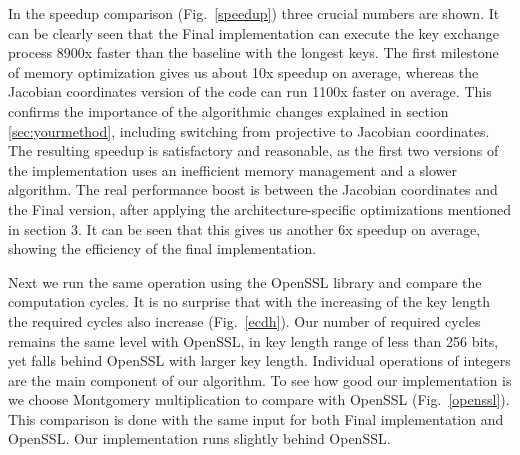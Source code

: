 In the speedup comparison (Fig.~\ref{speedup}) three crucial numbers are shown. It can be clearly seen that the Final implementation can execute the key exchange process 8900x faster than the baseline with the longest keys. The first milestone of memory optimization gives us about 10x speedup on average, whereas the Jacobian coordinates version of the code can run 1100x faster on average. This confirms the importance of the algorithmic changes explained in section \ref{sec:yourmethod}, including switching from projective to Jacobian coordinates. The resulting speedup is satisfactory and reasonable, as the first two versions of the implementation uses an inefficient memory management and a slower algorithm. The real performance boost is between the Jacobian coordinates and the Final version, after applying the architecture-specific optimizations mentioned in section 3. It can be seen that this gives us another 6x speedup on average, showing the efficiency of the final implementation.

Next we run the same operation using the OpenSSL library and compare the computation cycles. It is no surprise that with the increasing of the key length the required cycles also increase (Fig.~\ref{ecdh}). Our number of required cycles remains the same level with OpenSSL, in key length range of less than 256 bits, yet falls behind OpenSSL with larger key length. Individual operations of integers are the main component of our algorithm. To see how good our implementation is we choose Montgomery multiplication to compare with OpenSSL (Fig.~\ref{openssl}). This comparison is done with the same input for both Final implementation and OpenSSL. Our implementation runs slightly behind OpenSSL. 

